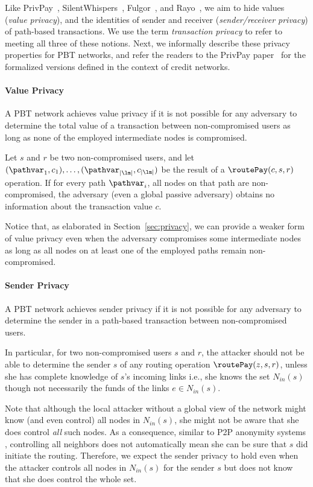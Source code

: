 Like PrivPay~\cite{moreno15privpay}, SilentWhispers~\cite{malavolta17silent}, Fulgor~\cite{malavolta17PCN}, and Rayo~\cite{malavolta17PCN}, we aim to hide values (\textit{value privacy}), 
and the identities of sender and receiver (\emph{sender/receiver privacy}) of
path-based transactions.  We use the term \emph{transaction privacy} to
refer to meeting all three of these notions.
Next, we informally describe these privacy properties for PBT networks, and refer the readers to the PrivPay paper~\cite{moreno15privpay}
for the formalized versions defined in the context of credit networks.

\paragraph*{Value Privacy} 
A PBT network achieves value privacy if
it is not possible for any adversary to determine the total
value of a transaction between non-compromised users
as long as none of the employed intermediate nodes is compromised.

Let $s$ and $r$ be two non-compromised users, and let $(\pathvar_1, c_1),
\ldots, (\pathvar_{|\lm|}, c_{|\lm|})$ be the result of a $\routePay(c,s,r)$ operation. 
If for every path $\pathvar_i$, 
all nodes on that path are non-compromised, 
the adversary (even a global passive adversary) 
obtains no information about the transaction value $c$. 

Notice that, as elaborated in Section~\ref{sec:privacy},
we can provide a weaker form of value privacy even when the adversary compromises some intermediate nodes
as long as all nodes on at least one of the employed paths remain non-compromised.

\paragraph*{Sender Privacy} 
A PBT network achieves sender privacy if
it is not possible for any adversary to determine the sender 
in a path-based transaction between non-compromised users.

In particular, for two non-compromised users $s$ and $r$, 
the attacker should not be able to determine the sender $s$ of any routing operation $\routePay(z,s,r)$,
unless she has complete knowledge of $s$'s incoming links %
i.e., she knows the set $N_{\textit{in}}(s)$ though not necessarily the funds of the links  $e \in N_{\textit{in}}(s)$.

Note that although the local attacker without a global view of the network might know (and even control) all nodes in $N_{\textit{in}}(s)$,
she might not be aware that she does control {\em all} such nodes. As a consequence, similar to P2P anonymity systems \cite{Crowds,AP3,ShadowWalker}, 
controlling all neighbors does not automatically mean she can be sure that 
$s$ did initiate the routing.
Therefore, we expect the sender privacy to hold even when the attacker controls all nodes in $N_{\textit{in}}(s)$ 
for the sender $s$ but does not know that she does control the whole set.

